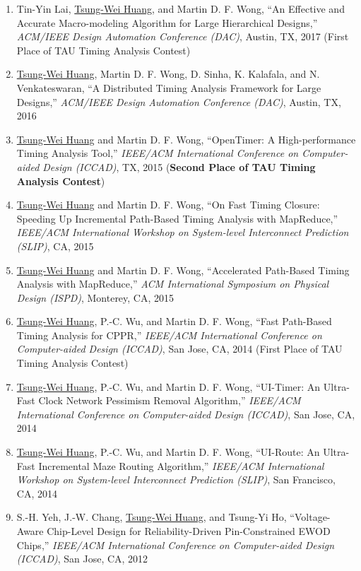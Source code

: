 \documentclass[A4,11pt]{article}
\begin{document}
\begin{enumerate}
    \item Tin-Yin Lai, \underline{Tsung-Wei Huang}, and Martin D. F. Wong, ``An Effective and Accurate Macro-modeling Algorithm for Large Hierarchical Designs,'' \textit{ACM/IEEE Design Automation Conference (DAC)}, Austin, TX, 2017 (First Place of TAU Timing Analysis Contest)
    \item \underline{Tsung-Wei Huang}, Martin D. F. Wong, D. Sinha, K. Kalafala, and N. Venkateswaran, ``A Distributed Timing Analysis Framework for Large Designs,'' \textit{ACM/IEEE Design Automation Conference (DAC)}, Austin, TX, 2016
    \item \underline{Tsung-Wei Huang} and Martin D. F. Wong, ``OpenTimer: A High-performance Timing Analysis Tool,'' \textit{IEEE/ACM International Conference on Computer-aided Design (ICCAD)}, TX, 2015 (\textbf{Second Place of TAU Timing Analysis Contest})
    \item \underline{Tsung-Wei Huang} and Martin D. F. Wong, ``On Fast Timing Closure: Speeding Up Incremental Path-Based Timing Analysis with MapReduce,'' \textit{IEEE/ACM International Workshop on System-level Interconnect Prediction (SLIP)}, CA, 2015
    \item \underline{Tsung-Wei Huang} and Martin D. F. Wong, ``Accelerated Path-Based Timing Analysis with MapReduce,'' \textit{ACM International Symposium on Physical Design (ISPD)}, Monterey, CA, 2015
    \item \underline{Tsung-Wei Huang}, P.-C. Wu, and Martin D. F. Wong, ``Fast Path-Based Timing Analysis for CPPR,'' \textit{IEEE/ACM International Conference on Computer-aided Design (ICCAD)}, San Jose, CA, 2014 (First Place of TAU Timing Analysis Contest)
    \item \underline{Tsung-Wei Huang}, P.-C. Wu, and Martin D. F. Wong, ``UI-Timer: An Ultra-Fast Clock Network Pessimism Removal Algorithm,'' \textit{IEEE/ACM International Conference on Computer-aided Design (ICCAD)}, San Jose, CA, 2014 
    \item \underline{Tsung-Wei Huang}, P.-C. Wu, and Martin D. F. Wong, ``UI-Route: An Ultra-Fast Incremental Maze Routing Algorithm,'' \textit{IEEE/ACM International Workshop on System-level Interconnect Prediction (SLIP)}, San Francisco, CA, 2014
    \item S.-H. Yeh, J.-W. Chang, \underline{Tsung-Wei Huang}, and Tsung-Yi Ho, ``Voltage-Aware Chip-Level Design for Reliability-Driven Pin-Constrained EWOD Chips,'' \textit{IEEE/ACM International Conference on Computer-aided Design (ICCAD)}, San Jose, CA, 2012

\end{enumerate}
\end{document}
